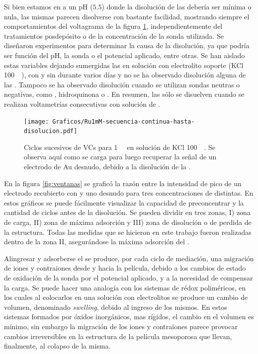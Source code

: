 		Si bien estamos en a un pH ($5.5$) donde la disolución de las \pdmF\space debería ser mínima o nula, las mismas parecen disolverse con bastante facilidad, mostrando siempre el comportamientos del voltagrama de la figura \ref{fig:diso_ru1mM}, independientemente del tratamientos posdepósito o de la concentración de la sonda utilizada. Se diseñaron experimentos para determinar la causa de la disolución, ya que podría ser función del pH, la sonda o el potencial aplicado, entre otras. Se han aislado estas variables dejando sumergidas las \pdmF\space en solución con electrolito soporte (KCl \SI{100}{\milli\Molar}), con y sin \ru\space durante varios días y no se ha observado disolución alguna de las \pdm. Tampoco se ha observado disolución cuando se utilizan sondas neutras o negativas, como \fe, hidroquinona o \fc. En resumen, las \pdmF\space sólo se disuelven cuando se realizan voltametrías consecutivas con solución de \ru\space.
			
		 	\begin{figure}[t!]
				\centering
		 	    \texttt{[image: Graficos/Ru1mM-secuencia-continua-hasta-disolucion.pdf]}
		        \caption[Disolución de una \pdmF\space en \ru.]{Ciclos sucesivos de VCs para \ru\space \SI{1}{\milli\Molar} en solución de KCl \SI{100}{\milli\Molar}. Se observa aquí como se carga para luego recuperar la señal de un electrodo de Au  desnudo, debido a la disolución de la \pdmF.}
		        \label{fig:diso_ru1mM}
		      	\end{figure} 

	    En la figura \ref{fig:ventanas} se graficó la razón entre la intensidad de pico de un electrodo recubierto con \pdmF\space y uno desnudo para tres concentraciones de \ru\space distintas. En estos gráficos se puede fácilmente visualizar la capacidad de preconcentrar y la cantidad de ciclos antes de la disolución. Se pueden dividir en tres zonas, I) zona de carga, II) zona de máxima adsorción y III) zona de disolución o de perdida de la estructura. Todas las medidas que se hicieron en este trabajo fueron realizadas dentro de la zona II, asegurándose la máxima adsorción del \ru\space.


		Al\space ingresar y adsorberse el \ru\space se produce, por cada ciclo de mediación, una migración de iones y contraiones desde y hacia la película, debido a los cambios de estado de oxidación de la sonda por el potencial aplicado, y a la necesidad de compensar la carga.  Se puede hacer una analogía con los sistemas de rédox poliméricos, en los cuales al colocarlos en una solución con electrolitos se produce un cambio de volumen, denominado \textit{swelling}, debido al ingreso de los mismos\cite{ybarra2005}. En estos sistemas formados por óxidos inorgánicos, mas rígidos, el cambio en el volumen es mínimo,\cite{Malfatti2009} sin embargo la migración de los iones y contraiones parece provocar cambios irreversibles en la estructura de la película mesoporosa que llevan, finalmente, al colapso de la misma.

